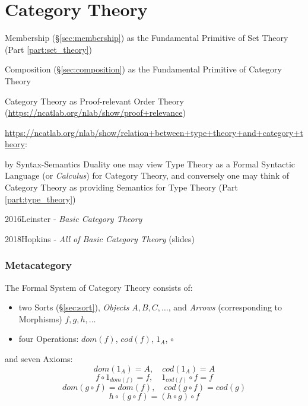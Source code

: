 \part{Category Theory}\label{part:category_theory}
\cite{awodey06}\cite{maclane69}

Membership (\S\ref{sec:membership}) as the Fundamental Primitive of
Set Theory (Part \ref{part:set_theory})

Composition (\S\ref{sec:composition}) as the Fundamental Primitive of
Category Theory

Category Theory as Proof-relevant Order Theory
(\url{https://ncatlab.org/nlab/show/proof+relevance})

\url{https://ncatlab.org/nlab/show/relation+between+type+theory+and+category+theory}:

by Syntax-Semantics Duality one may view Type Theory as a Formal Syntactic
Language (or \emph{Calculus}) for Category Theory, and conversely one may think
of Category Theory as providing Semantics for Type Theory (Part
\ref{part:type_theory})

2016Leinster - \emph{Basic Category Theory}

2018Hopkins - \emph{All of Basic Category Theory} (slides)



\section{Metacategory}\label{sec:metacategory}

The Formal System of Category Theory consists of:
\begin{itemize}
\item two Sorts (\S\ref{sec:sort}), \emph{Objects} $A,B,C,\ldots$, and
  \emph{Arrows} (corresponding to Morphisms) $f,g,h,\ldots$
\item four Operations: $dom(f)$, $cod(f)$, $1_A$, $\circ$
\end{itemize}
and seven Axioms:
\[
  dom(1_A) = A,\quad cod(1_A) = A
\]\[
  f \circ 1_{dom(f)} = f, \quad 1_{cod(f)} \circ f = f
\]\[
  dom(g\circ f) = dom(f), \quad cod(g \circ f) = cod(g)
\]\[
  h \circ (g \circ f) = (h \circ g) \circ f
\]

